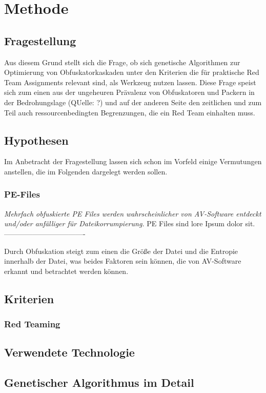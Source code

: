 \chapter{Methode}
\label{chapt:Methode}
\section{Fragestellung}
Aus diesem Grund stellt sich die Frage, ob sich genetische Algorithmen zur Optimierung von Obfuskatorkaskaden unter den Kriterien die für praktische Red Team Assignments relevant sind, als Werkzeug nutzen lassen. Diese Frage speist sich zum einen aus der ungeheuren Prävalenz von Obfuskatoren und Packern in der Bedrohungslage (QUelle: ?) und auf der anderen Seite den zeitlichen und zum Teil auch ressourcenbedingten Begrenzungen, die ein Red Team einhalten muss. 

\section{Hypothesen}
Im Anbetracht der Fragestellung lassen sich schon im Vorfeld einige Vermutungen anstellen, die im Folgenden dargelegt werden sollen.
\subsection{PE-Files}
\textit{Mehrfach obfuskierte PE Files werden wahrscheinlicher von AV-Software entdeckt und/oder anfälliger für Dateikorrumpierung.}
PE Files sind lore Ipsum dolor sit. ----------------------------------

Durch Obfuskation steigt zum einen die Größe der Datei und die Entropie innerhalb der Datei, was beides Faktoren sein können, die von AV-Software erkannt und betrachtet werden können.



\section{Kriterien}
    \subsection{Red Teaming}
\section{Verwendete Technologie}
\section{Genetischer Algorithmus im Detail}
